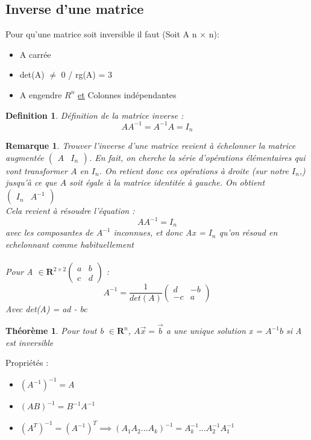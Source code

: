 \documentclass{article}
\newtheorem{definition}{Definition}[section]
\newtheorem{remark}{Remarque}[section]
\newtheorem{theorem}{Théorème}[section]
\begin{document}
\subsection{Inverse d'une matrice}
Pour qu'une matrice soit inversible il faut (Soit A n $\times$ n):
\begin{itemize}
    \item A carrée
    \item det(A) $\neq$ 0 / rg(A) = 3
    \item A engendre $R^n$ \underline{et} Colonnes indépendantes
\end{itemize}
\begin{definition} Définition de la matrice inverse :
    \[ AA^{-1} = A^{-1}A = I_n\]
\end{definition}
\begin{remark}
    Trouver l'inverse d'une matrice revient à échelonner la matrice augmentée $ \begin{pmatrix}
        A & I_n
    \end{pmatrix} $. En fait, on cherche la série d'opérations élémentaires qui vont transformer $ A $ en $ I_n $. On retient donc ces opérations à droite (sur notre $ I_n $,) jusqu'à ce que $ A $ soit égale à la matrice identitée à gauche. On obtient $ \begin{pmatrix}
        I_n & A^{-1}
    \end{pmatrix} $ \\
    Cela revient à résoudre l'équation : \[ AA^{-1} = I_n \] avec les composantes de $A^{-1}$ inconnues, et donc Ax = $I_n$ qu'on résoud en echelonnant comme habituellement \\\\
    Pour A $\in \mathbf{R}^{2 \times 2} \begin{pmatrix}
        a & b \\
        c & d
    \end{pmatrix}$ :
    \[ A^{-1} = \frac{1}{det(A)} \begin{pmatrix}
        d & -b \\
        -c & a
    \end{pmatrix}\]
    Avec det(A) = ad - bc
\end{remark}
\begin{theorem}
    Pour tout b $\in \mathbf{R}^n$, $A\overrightarrow{x} = \overrightarrow{b}$ a une unique solution x = $A^{-1}b$ si A est inversible
\end{theorem}
Propriétés :
\begin{itemize}
    \item $(A^{-1})^{-1} = A$
    \item $(AB)^{-1} = B^{-1}A^{-1} $
    \item $ (A^T)^{-1} = (A^{-1})^T \implies (A_1A_2...A_k)^{-1} = A_k^{-1}...A_2^{-1}A_1^{-1} $
\end{itemize}
\end{document}
